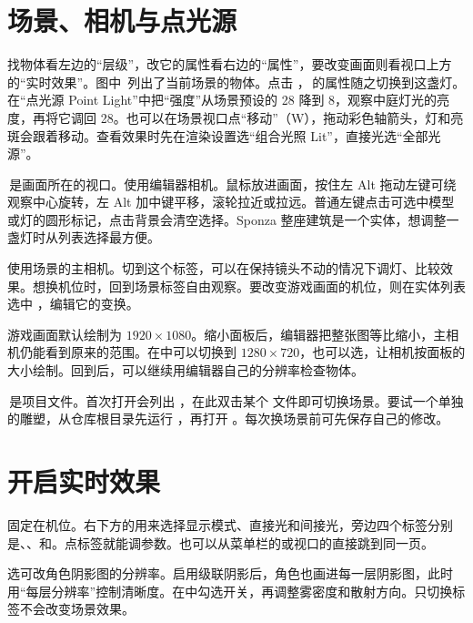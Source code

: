 \clearpage
\section{场景、相机与点光源}


找物体看左边的“层级”，改它的属性看右边的“属性”，要改变画面则看视口上方的“实时效果”。图中 \,列出了当前场景的物体。点击 ，\,的属性随之切换到这盏灯。在“点光源 Point Light”中把“强度”从场景预设的 28 降到 8，观察中庭灯光的亮度，再将它调回 28。也可以在场景视口点“移动”（W），拖动彩色轴箭头，灯和亮斑会跟着移动。查看效果时先在渲染设置选“组合光照 Lit”，直接光选“全部光源”。

\,是画面所在的视口。使用编辑器相机。鼠标放进画面，按住左 Alt 拖动左键可绕观察中心旋转，左 Alt 加中键平移，滚轮拉近或拉远。普通左键点击可选中模型或灯的圆形标记，点击背景会清空选择。Sponza 整座建筑是一个实体，想调整一盏灯时从列表选择最方便。

使用场景的主相机。切到这个标签，可以在保持镜头不动的情况下调灯、比较效果。想换机位时，回到场景标签自由观察。要改变游戏画面的机位，则在实体列表选中 ，编辑它的变换。

游戏画面默认绘制为 $1920\times1080$。缩小面板后，编辑器把整张图等比缩小，主相机仍能看到原来的范围。在中可以切换到 $1280\times720$，也可以选，让相机按面板的大小绘制。回到后，可以继续用编辑器自己的分辨率检查物体。

\,是项目文件。首次打开会列出 ，在此双击某个  文件即可切换场景。要试一个单独的雕塑，从仓库根目录先运行 ，再打开 。每次换场景前可先保存自己的修改。

\clearpage
\section{开启实时效果}
固定在机位。右下方的用来选择显示模式、直接光和间接光，旁边四个标签分别是、、和。点标签就能调参数。也可以从菜单栏的或视口的直接跳到同一页。



选可改角色阴影图的分辨率。启用级联阴影后，角色也画进每一层阴影图，此时用“每层分辨率”控制清晰度。在中勾选开关，再调整雾密度和散射方向。只切换标签不会改变场景效果。

